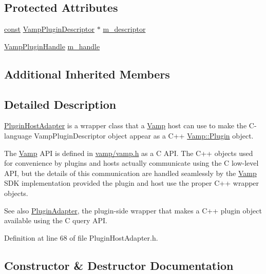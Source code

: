 \subsection*{Protected Attributes}
\begin{DoxyCompactItemize}
\item 
\hyperlink{getopt1_8c_a2c212835823e3c54a8ab6d95c652660e}{const} \hyperlink{vamp_8h_aa1d6e0792099b9516a89b5fb7ed2ad2b}{Vamp\+Plugin\+Descriptor} $\ast$ \hyperlink{class_vamp_1_1_plugin_host_adapter_a0c9f252aca8ac298e30cadd0de032ec2}{m\+\_\+descriptor}
\item 
\hyperlink{vamp_8h_ad3be2952b1f4ad7d775940a6db75c79b}{Vamp\+Plugin\+Handle} \hyperlink{class_vamp_1_1_plugin_host_adapter_a02ebd03b226b4a467cad747ce77e79ee}{m\+\_\+handle}
\end{DoxyCompactItemize}
\subsection*{Additional Inherited Members}


\subsection{Detailed Description}
\hyperlink{class_vamp_1_1_plugin_host_adapter}{Plugin\+Host\+Adapter} is a wrapper class that a \hyperlink{namespace_vamp}{Vamp} host can use to make the C-\/language Vamp\+Plugin\+Descriptor object appear as a C++ \hyperlink{class_vamp_1_1_plugin}{Vamp\+::\+Plugin} object.

The \hyperlink{namespace_vamp}{Vamp} A\+PI is defined in \hyperlink{vamp_8h}{vamp/vamp.\+h} as a C A\+PI. The C++ objects used for convenience by plugins and hosts actually communicate using the C low-\/level A\+PI, but the details of this communication are handled seamlessly by the \hyperlink{namespace_vamp}{Vamp} S\+DK implementation provided the plugin and host use the proper C++ wrapper objects.

See also \hyperlink{class_vamp_1_1_plugin_adapter}{Plugin\+Adapter}, the plugin-\/side wrapper that makes a C++ plugin object available using the C query A\+PI. 

Definition at line 68 of file Plugin\+Host\+Adapter.\+h.



\subsection{Constructor \& Destructor Documentation}
